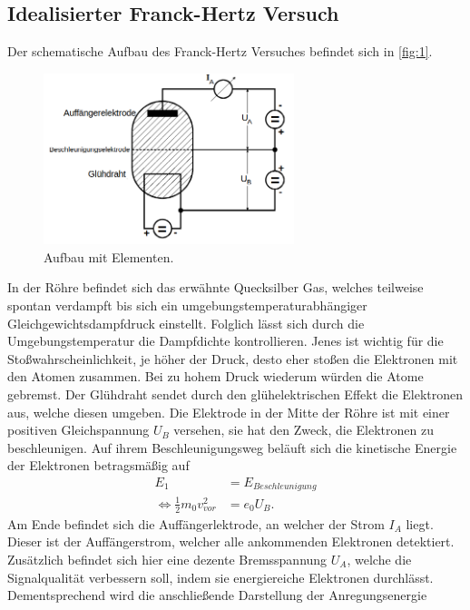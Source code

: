\subsection{Idealisierter Franck-Hertz Versuch}
Der schematische Aufbau des Franck-Hertz Versuches befindet sich in \autoref{fig:1}.
\begin{figure}[H]
    \centering
        \centering
        \includegraphics[width=0.65\textwidth]{Bilder/fha.png}
        \caption{Aufbau mit Elementen. \cite{anleitung5}}
    \hfill
    \label{fig:1}
\end{figure}
\noindent In der Röhre befindet sich das erwähnte Quecksilber Gas, welches
teilweise spontan verdampft bis sich ein umgebungstemperaturabhängiger 
Gleichgewichtsdampfdruck einstellt. Folglich lässt sich durch 
die Umgebungstemperatur die Dampfdichte kontrollieren. Jenes ist wichtig für die
Stoßwahrscheinlichkeit, je höher der Druck, desto eher stoßen die Elektronen
mit den Atomen zusammen. Bei zu hohem Druck wiederum würden die Atome gebremst. 
Der Glühdraht sendet durch den glühelektrischen Effekt die Elektronen aus, welche 
diesen umgeben. Die Elektrode in der Mitte der Röhre ist mit einer positiven
Gleichspannung $U_B$ versehen, sie hat den Zweck, die Elektronen zu beschleunigen.
Auf ihrem Beschleunigungsweg beläuft sich die kinetische Energie der Elektronen 
betragsmäßig auf
\begin{align}
    \label{eqn:2}
    E_1 &= E_{Beschleunigung} \\
    \Longleftrightarrow \frac{1}{2} m_0 v_{vor}^2 &= e_0 U_B.
\end{align}
\noindent Am Ende befindet sich die Auffängerlektrode, an welcher der Strom 
$I_A$ liegt. Dieser ist der Auffängerstrom, welcher alle ankommenden Elektronen 
detektiert. Zusätzlich befindet sich hier eine dezente Bremsspannung $U_A$,
welche die Signalqualität verbessern soll, indem sie energiereiche Elektronen 
durchlässt. Dementsprechend wird die anschließende Darstellung der Anregungsenergie 

